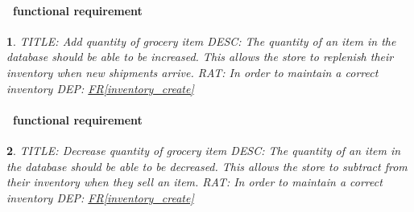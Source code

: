 \documentclass{scrreprt}
\theoremstyle{funreq}
\newtheorem{funreq}{}
\newcommand*{\reqref}[1]{\hyperref[#1]{FR\ref*{#1}}}
\begin{document}
	
	\paragraph[]{\Subsectionname ~functional requirement }
	\begin{funreq}
		\label{inventory_increasenumber}
		TITLE: Add quantity of grocery item
		DESC: The quantity of an item in the database should be able to be increased.  This allows the store to replenish their inventory when new shipments arrive.
		RAT: In order to maintain a correct inventory
		DEP: \reqref{inventory_create}
	\end{funreq}

	\paragraph[]{\Subsectionname ~functional requirement }
	\begin{funreq}
		\label{inventory_decreasenumber}
		TITLE: Decrease quantity of grocery item
		DESC: The quantity of an item in the database should be able to be decreased.  This allows the store to subtract from their inventory when they sell an item.
		RAT: In order to maintain a correct inventory
		DEP: \reqref{inventory_create}
	\end{funreq}
	
\end{document}
